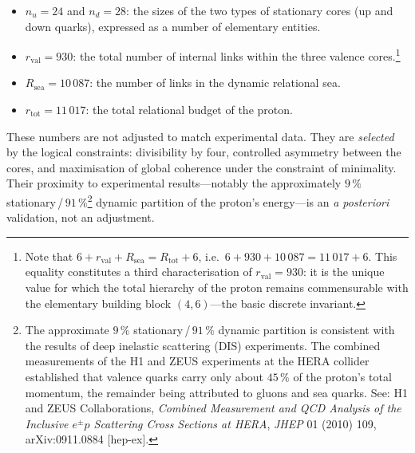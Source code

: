 \documentclass[12pt, a4paper, openright]{book}
\begin{document}
\begin{itemize}
\item $n_u = 24$ and $n_d = 28$: the sizes of the two types of stationary cores (up and down quarks), expressed as a number of elementary entities.
\item $r_{\text{val}} = 930$: the total number of internal links within the three valence cores.\footnote{Note that $6 + r_{\text{val}} + R_{\text{sea}} = R_{\text{tot}} + 6$, i.e.\ $6 + 930 + 10\,087 = 11\,017 + 6$. This equality constitutes a third characterisation of $r_{\text{val}} = 930$: it is the unique value for which the total hierarchy of the proton remains commensurable with the elementary building block $(4,6)$---the basic discrete invariant.}
\item $R_{\text{sea}} = 10\,087$: the number of links in the dynamic relational sea.
\item $r_{\text{tot}} = 11\,017$: the total relational budget of the proton.
\end{itemize}

These numbers are not adjusted to match experimental data. They are \emph{selected} by the logical constraints: divisibility by four, controlled asymmetry between the cores, and maximisation of global coherence under the constraint of minimality. Their proximity to experimental results---notably the approximately $9\,\%$ stationary\,/\,$91\,\%$\footnote{The approximate $9\,\%$ stationary\,/\,$91\,\%$ dynamic partition is consistent with the results of deep inelastic scattering (DIS) experiments. The combined measurements of the H1 and ZEUS experiments at the HERA collider established that valence quarks carry only about $45\,\%$ of the proton's total momentum, the remainder being attributed to gluons and sea quarks. See: H1 and ZEUS Collaborations, \textit{Combined Measurement and QCD Analysis of the Inclusive $e^{\pm}p$ Scattering Cross Sections at HERA}, \textit{JHEP} 01 (2010) 109, arXiv:0911.0884 [hep-ex].} dynamic partition of the proton's energy---is an \emph{a posteriori} validation, not an adjustment.

\medskip
\end{document}
